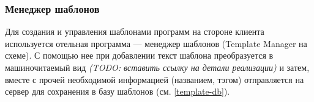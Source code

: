 \subsubsection{Менеджер шаблонов}
Для создания и управления шаблонами программ на стороне клиента используется отельная
программа --- менеджер шаблонов (Template Manager на схеме). С помощью нее при добавлении текст шаблона
преобразуется в машиночитаемый вид \textit{(TODO: вставить ссылку на детали реализации)}
и затем, вместе с прочей необходимой информацией (названием, тэгом) отправляется на сервер
для сохранения в базу шаблонов (см. \ref{template-db}).
